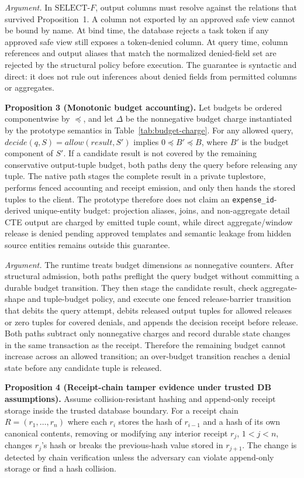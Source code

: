 \documentclass[journal]{IEEEtran}
\begin{document}
\emph{Argument.} In \(\mathrm{SELECT}\text{-}F\), output columns must
resolve against the relations that survived Proposition~1. A column not
exported by an approved safe view cannot be bound by name. At bind time,
the database rejects a task token if any approved safe view still exposes
a token-denied column. At query time, column references and output aliases
that match the normalized denied-field set are rejected by the structural
policy before execution. The guarantee is syntactic and direct: it does
not rule out inferences about denied fields from permitted columns or
aggregates.

\noindent\textbf{Proposition 3 (Monotonic budget accounting).}
Let budgets be ordered componentwise by \(\preceq\), and let
\(\Delta\) be the nonnegative budget charge instantiated by the
prototype semantics in Table~\ref{tab:budget-charge}. For any allowed query,
\(decide(q,S)=allow(result,S')\) implies
\(0 \preceq B' \preceq B\), where \(B'\) is the budget component of
\(S'\). If a candidate result is not covered by the remaining
conservative output-tuple budget, both paths deny the query before
releasing any tuple. The native path stages the complete result in a
private tuplestore, performs fenced accounting and receipt emission, and
only then hands the stored tuples to the client. The prototype therefore
does not claim an \texttt{expense\_id}-derived unique-entity budget:
projection aliases, joins, and non-aggregate detail CTE output are
charged by emitted tuple count, while direct aggregate/window release is
denied pending approved templates and semantic leakage from hidden source
entities remains outside this guarantee.

\emph{Argument.} The runtime treats budget dimensions as nonnegative
counters. After structural admission, both paths preflight the query budget
without committing a durable budget transition. They then stage the candidate
result, check aggregate-shape and tuple-budget policy, and execute one fenced
release-barrier transition that debits the query attempt, debits released
output tuples for allowed releases or zero tuples for covered denials, and
appends the decision receipt before release. Both paths subtract only
nonnegative charges and record durable state changes in the same transaction as
the receipt.
Therefore the remaining budget cannot increase across an allowed transition;
an over-budget transition reaches a denial state before any candidate tuple is
released.

\noindent\textbf{Proposition 4 (Receipt-chain tamper evidence under
trusted DB assumptions).}
Assume collision-resistant hashing and append-only receipt storage
inside the trusted database boundary. For a receipt chain
\(R=(r_1,\ldots,r_n)\) where each \(r_i\) stores the hash of
\(r_{i-1}\) and a hash of its own canonical contents, removing or
modifying any interior receipt \(r_j\), \(1<j<n\), changes \(r_j\)'s
hash or breaks the previous-hash value stored in \(r_{j+1}\). The
change is detected by chain verification unless the adversary can
violate append-only storage or find a hash collision.
\end{document}
